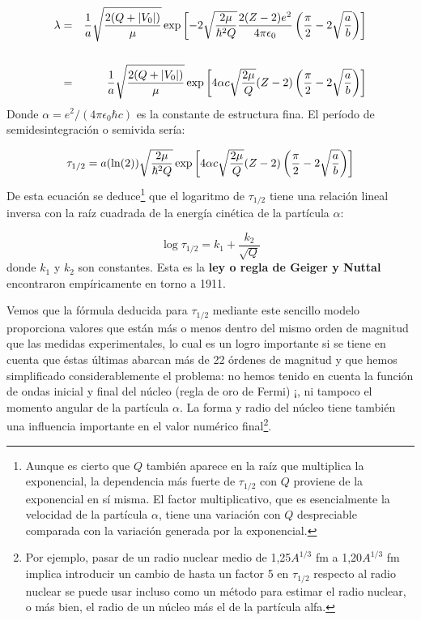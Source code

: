 \begin{eqnarray}
    \lambda & = & \frac{1}{a} \sqrt{\frac{2(Q+|V_0|)}{\mu}} \exp \left[ -2  \sqrt{\frac{2 \mu}{\hbar^2 Q}} \frac{2(Z-2)e^2}{4 \pi \epsilon_0} \left( \frac{\pi}{2}-2\sqrt{\frac{a}{b}} \right) \right] \\ \\
            & = & \frac{1}{a} \sqrt{\frac{2(Q+|V_0|)}{\mu}}  \exp \left[ 4 \alpha c \sqrt{\frac{2 \mu}{Q}} (Z-2) \left( \frac{\pi}{2}-2\sqrt{\frac{a}{b}} \right) \right]
\end{eqnarray}
Donde $\alpha=e^2/(4 \pi \epsilon_0 \hbar c)$ es la constante de estructura fina. El período de semidesintegración o semivida sería:

\begin{equation}
    \tau_{1/2} = a (\ln (2)) \sqrt{\frac{2\mu}{\hbar^2Q}} \exp \left[ 4 \alpha c \sqrt{\frac{2 \mu}{Q}} (Z-2) \left( \frac{\pi}{2}-2\sqrt{\frac{a}{b}} \right) \right]
\end{equation}
De esta ecuación se deduce\footnote{Aunque es cierto que $Q$ también aparece en la raíz que multiplica la exponencial, la dependencia más fuerte de $\tau_{1/2}$ con $Q$ proviene de la exponencial en sí misma. El factor multiplicativo, que es esencialmente la velocidad de la partícula $\alpha$, tiene una variación con $Q$ despreciable comparada con la variación generada por la exponencial.} que el logaritmo de $\tau_{1/2}$ tiene una relación lineal inversa con la raíz cuadrada de la energía cinética de la partícula $\alpha$:

\begin{equation}
    \log \tau_{1/2} = k_1 + \frac{k_2}{\sqrt{Q}}
\end{equation}
donde $k_1$ y $k_2$ son constantes. Esta es la \textbf{ley o regla de Geiger y Nuttal} encontraron empíricamente en torno a 1911. %

Vemos que la fórmula deducida para $\tau_{1/2}$ mediante este sencillo modelo proporciona valores que están más o menos dentro del mismo orden de magnitud que las medidas experimentales, lo cual es un logro importante si se tiene en cuenta que éstas últimas abarcan más de 22 órdenes de magnitud y que hemos simplificado considerablemente el problema: no hemos tenido en cuenta la función de ondas inicial y final del núcleo (regla de oro de Fermi) ¡, ni tampoco el momento angular de la partícula $\alpha$. La forma y radio del núcleo tiene también una influencia importante en el valor numérico final\footnote{Por ejemplo, pasar de un radio nuclear medio de 1,25$A^{1/3}$ fm a 1,20$A^{1/3}$ fm implica introducir un cambio de hasta un factor 5 en $\tau_{1/2}$ respecto al radio nuclear se puede usar incluso como un método para estimar el radio nuclear, o más bien, el radio de un núcleo más el de la partícula alfa.}.

